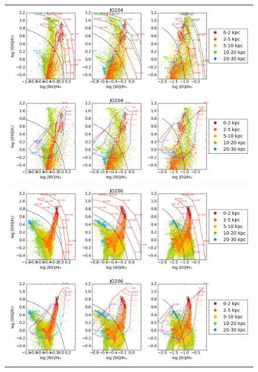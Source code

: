 \documentclass[fleqn,usenatbib]{mnras}
\begin{document}
\begin{figure}
	\begin{tabular}{c}
		\includegraphics[width=.8\linewidth]{Plots/JO204_vo_dist_NLR.png}\\
		\includegraphics[width=.8\linewidth]{Plots/JO204_vo_dist_SH_n1_R_tot.png}\\
		\includegraphics[width=.8\linewidth]{Plots/JO206_vo_dist_NLR.png}\\
		\includegraphics[width=.8\linewidth]{Plots/JO206_vo_dist_SH_n1_R_tot.png}\\
	\end{tabular} 
	\contcaption{}
\end{figure}
\end{document}
